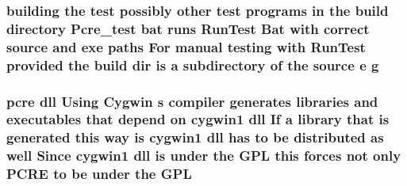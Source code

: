 \subsubsection[{\texorpdfstring{g}{g}}]{\setlength{\rightskip}{0pt plus 5cm}building the test possibly other test programs {\bf in} the build {\bf directory} Pcre\+\_\+test {\bf bat} runs Run\+Test Bat {\bf with} correct {\bf source} and {\bf exe} paths For manual testing {\bf with} Run\+Test provided the build {\bf dir} {\bf is} {\bf a} subdirectory {\bf of} the {\bf source} {\bf e} g}\hypertarget{NON-AUTOTOOLS-BUILD_8txt_a50403b1fefb03c2a6080e2d29aa9a2c4}{}\label{NON-AUTOTOOLS-BUILD_8txt_a50403b1fefb03c2a6080e2d29aa9a2c4}
\subsubsection[{\texorpdfstring{G\+PL}{GPL}}]{ {\bf pcre} dll Using Cygwin {\bf s} {\bf compiler} generates {\bf libraries} and executables that depend {\bf on} cygwin1 dll If {\bf a} {\bf library} that {\bf is} {\bf generated} {\bf this} {\bf way} {\bf is} cygwin1 dll has {\bf to} {\bf be} {\bf distributed} {\bf as} well Since cygwin1 dll {\bf is} under the G\+PL {\bf this} forces {\bf not} only {\bf P\+C\+RE} {\bf to} {\bf be} under the G\+PL}\hypertarget{NON-AUTOTOOLS-BUILD_8txt_a18ab3a59055ea626a01be5ffacc94154}{}\label{NON-AUTOTOOLS-BUILD_8txt_a18ab3a59055ea626a01be5ffacc94154}

